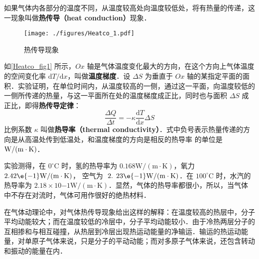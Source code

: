
如果气体内各部分的温度不同，从温度较高处向温度较低处，将有热量的传递，这一现象叫做\textbf{热传导（heat conduction）}现象．

\begin{figure}[ht]
\centering
\texttt{[image: ./figures/Heatco\_1.pdf]}
\caption{热传导现象} \label{Heatco_fig1}
\end{figure}

如\autoref{Heatco_fig1} 所示，$Ox$ 轴是气体温度变化最大的方向，在这个方向上气体温度的空间变化率 $\mathrm dT/\mathrm dx$，叫做\textbf{温度梯度}．设 $\Delta S$ 为垂直于 $Ox $ 轴的某指定平面的面积．实验证明，在单位时间内，从温度较高的一侧，通过这一平面，向温度较低的一侧所传递的热量，与这一平面所在处的温度梯度成正比，同时也与面积 $\Delta S$ 成正比，即得\textbf{热传导定律}：
\begin{equation}
\frac{\Delta Q}{\Delta t}=-\kappa \frac{\mathrm{d} T}{\mathrm{d} x} \Delta S
\end{equation}
比例系数 $\kappa$ 叫做\textbf{热导率（thermal conductivity）}．式中负号表示热量传递的方向是从高温处传到低温处，和温度梯度的方向是相反的热导率
的单位是 $\rm W /(m \cdot K)$．

实验测得，在 $0^{\circ} \mathrm{C}$ 时，氢的热导率为 $0.168 \mathrm{W} /(\mathrm{m} \cdot \mathrm{K})$，氧力 $2.42\e{-1} \mathrm{W} /(\mathrm{m} \cdot \mathrm{K})$， 空气为 $\text { 2. } 23\e{-1} \mathrm{W} /(\mathrm{m} \cdot \mathrm{K})$．在 $100^{\circ} \mathrm{C}$ 时，水汽的热导率为 $2. 18\times  10{-1}\mathrm{W} /(\mathrm{m} \cdot \mathrm{K})$．显然，气体的热导率都很小，所以，当气体中不存在对流时，气体可用作很好的绝热材料．

在气体动理论中，对气体热传导现象给出这样的解释：在温度较高的热层中，分子平均动能较大；而在温度较低的冷层中，分子平均动能较小．由于冷热两层分子的互相掺和与相互碰撞，从热层到冷层出现热运动能量的净输运．输运的热运动能量，对单原子气体来说，只是分子的平动动能；而对多原子气体来说，还包含转动和振动的能量在内．
